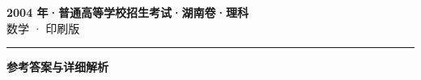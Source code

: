 \documentclass[zihao=5, a4paper]{ctexart}
\begin{document}
\begin{center}
  {\Large\bfseries 2004 年·普通高等学校招生考试·湖南卷·理科}\\[4pt]
  {\large 数学 · 印刷版}
\end{center}
\medskip
{}

\par\bigskip\hrule\bigskip
{}
\begin{center}{\large\bfseries 参考答案与详细解析}\end{center}
\smallskip

\end{document}
